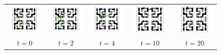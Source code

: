 \documentclass[letterpaper]{article} %
\begin{document}
\begin{figure}[t]
	\centering
	\begin{tabular}{ccccc}
		\includegraphics[width=0.18\linewidth]{figs/79/0.pdf} &
		\includegraphics[width=0.18\linewidth]{figs/79/2.pdf} &
		\includegraphics[width=0.18\linewidth]{figs/79/4.pdf} &
		\includegraphics[width=0.18\linewidth]{figs/79/10.pdf} &
		\includegraphics[width=0.18\linewidth]{figs/79/32.pdf} \\
		$t=0$ & $t=2$ & $t=4$ & $t=10$ & $t=20$
	\end{tabular}
\end{figure}
\end{document}
